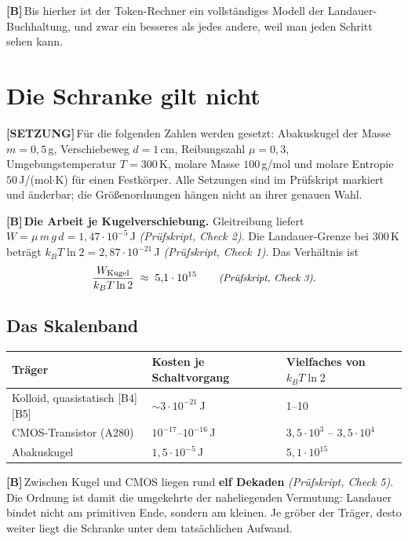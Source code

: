 \documentclass[11pt,a4paper]{article}
\newcommand{\LS}{\textcolor{laySet}{\textbf{\footnotesize\textsf{[SETZUNG]}}}\,}
\newcommand{\LB}{\textcolor{layB}{\textbf{\footnotesize\textsf{[B]}}}\,}
\newcommand{\pruef}[1]{{\small\itshape(Prüfskript, #1)}}
\begin{document}
\LB Bis hierher ist der Token-Rechner ein vollständiges Modell der
Landauer-Buchhaltung, und zwar ein besseres als jedes andere, weil man jeden
Schritt sehen kann.

\section{Die Schranke gilt nicht}

\LS Für die folgenden Zahlen werden gesetzt: Abakuskugel der Masse
$m = 0{,}5$\,g, Verschiebeweg $d = 1$\,cm, Reibungszahl $\mu = 0{,}3$,
Umgebungstemperatur $T = 300$\,K, molare Masse $100$\,g/mol und molare Entropie
$50$\,J/(mol$\cdot$K) für einen Festkörper. Alle Setzungen sind im Prüfskript
markiert und änderbar; die Größenordnungen hängen nicht an ihrer genauen Wahl.

\LB \textbf{Die Arbeit je Kugelverschiebung.} Gleitreibung liefert
$W = \mu\,m\,g\,d = 1{,}47\cdot10^{-5}$\,J \pruef{Check 2}. Die Landauer-Grenze
bei 300\,K beträgt $k_B T \ln 2 = 2{,}87\cdot10^{-21}$\,J \pruef{Check 1}. Das
Verhältnis ist
\begin{equation}
  \frac{W_{\text{Kugel}}}{k_B T \ln 2} \;\approx\; 5{,}1\cdot10^{15}
  \qquad \text{\pruef{Check 3}} .
\end{equation}

\subsection{Das Skalenband}

\begin{center}
\small
\begin{tabular}{@{}lll@{}}
\toprule
\textbf{Träger} & \textbf{Kosten je Schaltvorgang} & \textbf{Vielfaches von $k_BT\ln 2$} \\
\midrule
Kolloid, quasistatisch [B4][B5] & ${\sim}3\cdot10^{-21}$\,J & 1--10 \\
CMOS-Transistor (A280) & $10^{-17}$--$10^{-16}$\,J & $3{,}5\cdot10^{3}$ -- $3{,}5\cdot10^{4}$ \\
Abakuskugel & $1{,}5\cdot10^{-5}$\,J & $5{,}1\cdot10^{15}$ \\
\bottomrule
\end{tabular}
\end{center}

\LB Zwischen Kugel und CMOS liegen rund \textbf{elf Dekaden} \pruef{Check 5}. Die
Ordnung ist damit die umgekehrte der naheliegenden Vermutung: Landauer bindet
nicht am primitiven Ende, sondern am kleinen. Je gröber der Träger, desto weiter
liegt die Schranke unter dem tatsächlichen Aufwand.
\end{document}
